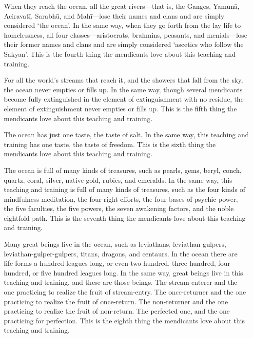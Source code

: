 \documentclass[12pt,openany]{book}%
\begin{document}
When they reach the ocean, all the great rivers—that is, the Ganges, \textsanskrit{Yamunā}, \textsanskrit{Aciravatī}, \textsanskrit{Sarabhū}, and \textsanskrit{Mahī}—lose their names and clans and are simply considered ‘the ocean’. In the same way, when they go forth from the lay life to homelessness, all four classes—aristocrats, brahmins, peasants, and menials—lose their former names and clans and are simply considered ‘ascetics who follow the Sakyan’. This is the fourth thing the mendicants love about this teaching and training. 

For all the world’s streams that reach it, and the showers that fall from the sky, the ocean never empties or fills up. In the same way, though several mendicants become fully extinguished in the element of extinguishment with no residue, the element of extinguishment never empties or fills up. This is the fifth thing the mendicants love about this teaching and training. 

The ocean has just one taste, the taste of salt. In the same way, this teaching and training has one taste, the taste of freedom. This is the sixth thing the mendicants love about this teaching and training. 

The ocean is full of many kinds of treasures, such as pearls, gems, beryl, conch, quartz, coral, silver, native gold, rubies, and emeralds. In the same way, this teaching and training is full of many kinds of treasures, such as the four kinds of mindfulness meditation, the four right efforts, the four bases of psychic power, the five faculties, the five powers, the seven awakening factors, and the noble eightfold path. This is the seventh thing the mendicants love about this teaching and training. 

Many great beings live in the ocean, such as leviathans, leviathan-gulpers, leviathan-gulper-gulpers, titans, dragons, and centaurs. In the ocean there are life-forms a hundred leagues long, or even two hundred, three hundred, four hundred, or five hundred leagues long. In the same way, great beings live in this teaching and training, and these are those beings. The stream-enterer and the one practicing to realize the fruit of stream-entry. The once-returner and the one practicing to realize the fruit of once-return. The non-returner and the one practicing to realize the fruit of non-return. The perfected one, and the one practicing for perfection. This is the eighth thing the mendicants love about this teaching and training. 
\end{document}
